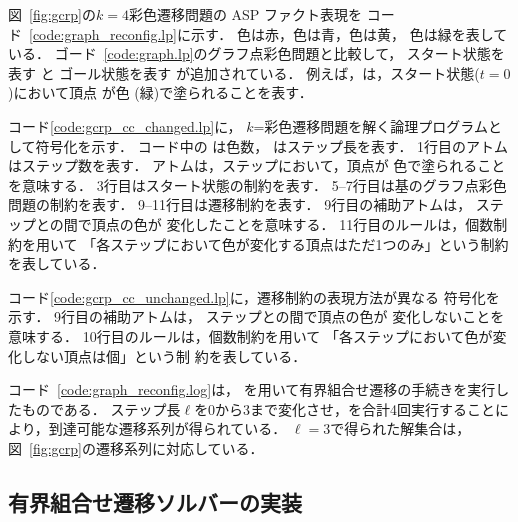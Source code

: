 

図~\ref{fig:gcrp}の$k=4$彩色遷移問題の ASP ファクト表現を
コード~\ref{code:graph_reconfig.lp}に示す．
色は赤，色は青，色は黄，
色は緑を表している．
ゴード~\ref{code:graph.lp}のグラフ点彩色問題と比較して，
スタート状態を表す
と
ゴール状態を表す
が追加されている．
例えば，は，スタート状態($t=0$)において頂点
が色 (緑)で塗られることを表す．

コード\ref{code:gcrp_cc_changed.lp}に，
$k$=彩色遷移問題を解く論理プログラムとして符号化を示す．
コード中の は色数， はステップ長を表す．
1行目のアトムはステップ数を表す．
アトムは，ステップにおいて，頂点が
色で塗られることを意味する．
3行目はスタート状態の制約を表す．
5--7行目は基のグラフ点彩色問題の制約を表す．
9--11行目は遷移制約を表す．
9行目の補助アトムは，
ステップとの間で頂点の色が
変化したことを意味する．
11行目のルールは，個数制約を用いて
「各ステップにおいて色が変化する頂点はただ1つのみ」という制約
を表している．

コード\ref{code:gcrp_cc_unchanged.lp}に，遷移制約の表現方法が異なる
符号化を示す．
9行目の補助アトムは，
ステップとの間で頂点の色が
変化しないことを意味する．
10行目のルールは，個数制約を用いて
「各ステップにおいて色が変化しない頂点は個」という制
約を表している．

コード~\ref{code:graph_reconfig.log}は，
{\clingo}を用いて有界組合せ遷移の手続きを実行したものである．
ステップ長$\ell$を0から3まで変化させ，{\clingo}を合計4回実行することに
より，到達可能な遷移系列が得られている．
$\ell=3$で得られた解集合は，図~\ref{fig:gcrp}の遷移系列に対応している．

\subsection{有界組合せ遷移ソルバーの実装} \label{sec:improved_solver}

